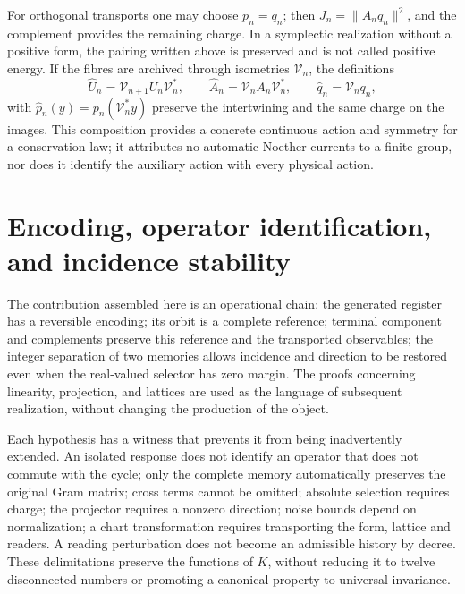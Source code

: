 For orthogonal transports one may choose \(p_n=q_n\); then \(J_n=\|A_nq_n\|^2\), and the complement provides the remaining charge. In a symplectic realization without a positive form, the pairing written above is preserved and is not called positive energy. If the fibres are archived through isometries \(\mathcal V_n\), the definitions
\[
 \widehat U_n=\mathcal V_{n+1}U_n\mathcal V_n^*,\qquad
 \widehat A_n=\mathcal V_nA_n\mathcal V_n^*,\qquad
 \widehat q_n=\mathcal V_nq_n,
\]
with \(\widehat p_n(y)=p_n(\mathcal V_n^*y)\) preserve the intertwining and the same charge on the images. This composition provides a concrete continuous action and symmetry for a conservation law; it attributes no automatic Noether currents to a finite group, nor does it identify the auxiliary action with every physical action.

\section{Encoding, operator identification, and incidence stability}
\label{x_reciprocidad:lib01:alcance}

The contribution assembled here is an operational chain: the generated register has a reversible encoding; its orbit is a complete reference; terminal component and complements preserve this reference and the transported observables; the integer separation of two memories allows incidence and direction to be restored even when the real-valued selector has zero margin. The proofs concerning linearity, projection, and lattices are used as the language of subsequent realization, without changing the production of the object.

Each hypothesis has a witness that prevents it from being inadvertently extended.
An isolated response does not identify an operator that does not commute with the
cycle; only the complete memory automatically preserves the original Gram matrix;
cross terms cannot be omitted; absolute selection requires
charge; the projector requires a nonzero direction; noise bounds
depend on normalization; a chart transformation requires transporting
the form, lattice and readers. A reading perturbation does not become
an admissible history by decree. These delimitations preserve the
functions of \(K\), without reducing it to twelve disconnected numbers or
promoting a canonical property to universal invariance.
